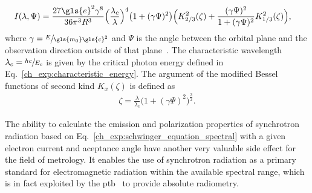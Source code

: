 \begin{align}
  I(\lambda,\Psi) &= \frac{27 \gls{e}^2 \gamma^8 }{36 \pi^3 R^3} \Big(\frac{\lambda_c}{\lambda}\Big)^4 \big(1+ (\gamma \Psi)^2\big)\Big( K_{2/3}^2(\zeta) + \frac{(\gamma \Psi)^2}{1 + (\gamma \Psi)^2} K_{1/3}^2(\zeta)\Big) \text{,}
 \label{ch_exp:schwinger_equation_spectral}
\end{align}
where $\gamma = \sfrac{E}{\gls{m_0} \gls{c}^2}$ and $\Psi$ is the angle between the orbital plane and the observation direction outside of that plane~\cite{schwinger_classical_1949}. The characteristic wavelength $\lambda_c = \sfrac{h c}{E_c}$ is given by the critical photon energy defined in Eq.~\eqref{ch_exp:characteristic_energy}. The argument of the modified Bessel functions of second kind $K_{x}(\zeta)$ is defined as
\begin{align}
 \zeta = \frac{\lambda}{\lambda_c} \big(1 + (\gamma \Psi)^2\big)^\frac{3}{2} \text{.}
\end{align}


The ability to calculate the emission and polarization properties of synchrotron radiation based on Eq.~\eqref{ch_exp:schwinger_equation_spectral} with a given electron current and aceptance angle have another very valuable side effect for the field of metrology. It enables the use of synchrotron radiation as a primary standard for electromagnetic radiation within the available spectral range, which is in fact exploited by the \gls{ptb}~\cite{thornagel_electron_2001} to provide absolute radiometry.

